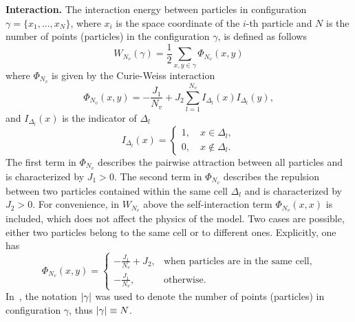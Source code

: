 \documentclass[12pt]{article}
\numberwithin{equation}{section}
\begin{document}
	\textbf{Interaction.} The interaction energy between particles in configuration $\gamma = \{x_1, ..., x_N\}$, where $x_i$ is the space coordinate of the $i$-th particle and $N$ is the number of points (particles) in the configuration $\gamma$, is defined as follows
	\begin{equation*}
		W_{N_v}(\gamma) = \frac{1}{2} \sum_{x,y \in \gamma} \Phi_{N_v} (x,y)
	\end{equation*}
	where $\Phi_{N_v}$ is given by the Curie-Weiss interaction
	\begin{equation}
		\label{def:curie-weiss-pot}
		\Phi_{N_v}(x, y) = -\frac{J_1}{N_v} + J_2\sum_{l=1}^{N_v} I_{\Delta_l}(x) I_{\Delta_l}(y),
	\end{equation}
	and $I_{\Delta_l}(x)$ is the indicator of $\Delta_l$
	\begin{equation}
		\label{def:I}
		I_{\Delta_l} (x) = \left\{
		\begin{array}{ll}
			1, \quad x \in \Delta_l,
			\\
			0, \quad x \notin \Delta_l.
		\end{array}
		\right.
	\end{equation} 
	The first term in $\Phi_{N_v}$ describes the pairwise attraction between all particles and is characterized by $J_1 > 0$. The second term in $\Phi_{N_v}$ describes the repulsion between two particles contained within the same cell $\Delta_l$ and is characterized by $J_2 > 0.$ For convenience, in $W_{N_v}$ above the self-interaction term $\Phi_{N_v}(x,x)$ is included, which does not affect the physics of the model. Two cases are possible, either two particles belong to the same cell or to different ones. Explicitly, one has
	\begin{equation}
		\Phi_{N_v}(x, y) = \left\{
		\begin{array}{ll}
			-\frac{J_1}{N_v} + J_2, & \text{when particles are in the same cell,}
			\\
			-\frac{J_1}{N_v}, & \text{otherwise.}
		\end{array}
		\right.
	\end{equation}
	In~\cite{KKD20}, the notation $\abs{\gamma}$ was used to denote the number of points (particles) in configuration $\gamma$, thus $\abs{\gamma} \equiv N$.
	
\end{document}

